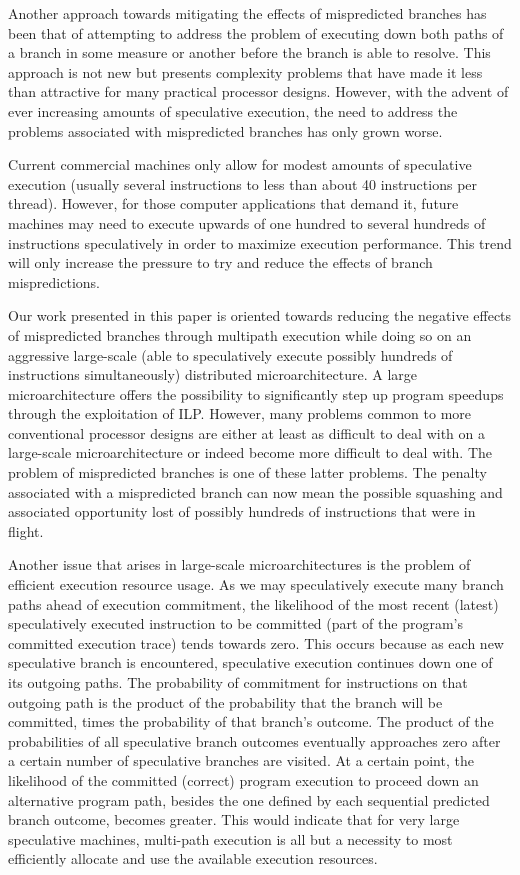 \documentclass[10pt,dvips]{article}
\begin{document}
Another approach towards mitigating the effects of mispredicted branches
has been that of attempting to address the problem of executing
down both paths of a branch in some measure or another before the
branch is able to resolve.  This approach is not new but presents
complexity problems that have made it less than attractive for
many practical processor designs.  However, with the advent of ever
increasing amounts of speculative execution, the need to address
the problems associated with mispredicted branches has only grown worse.

Current commercial machines only allow for modest
amounts of speculative execution (usually several instructions to 
less than about 40 instructions per thread).
However, for those computer applications that demand it,
future machines may need to execute upwards of one hundred to
several hundreds of instructions speculatively in order to maximize
execution performance.  This trend will only increase the pressure to try
and reduce the effects of branch mispredictions.

Our work presented in this paper is oriented towards reducing the
negative effects of mispredicted branches through multipath execution
while doing so on an aggressive large-scale (able to speculatively execute
possibly hundreds of instructions simultaneously)
distributed
microarchitecture.  
A large microarchitecture offers the
possibility to significantly step up program speedups through 
the exploitation of ILP.
However, many problems common to more conventional processor designs
are either at least as difficult to deal with on a large-scale
microarchitecture or indeed become more difficult to deal with.
The problem of mispredicted branches is one of these latter problems.
The penalty associated with a mispredicted branch can now mean
the possible squashing and associated opportunity lost of possibly
hundreds of instructions that were in flight.  

Another issue that arises in large-scale microarchitectures is the
problem of efficient execution resource usage.
As we may speculatively execute many branch paths ahead of execution
commitment, the likelihood
of the most recent (latest) speculatively executed instruction to
be committed (part of the program's committed execution trace) tends
towards zero.  This occurs because as each new speculative branch is
encountered, speculative execution continues down one of its
outgoing paths.  The probability of commitment for instructions on 
that outgoing
path is the product of the probability that
the branch will be committed, times the probability of that branch's outcome.
The product of the probabilities of all speculative branch outcomes
eventually approaches zero after a certain
number of speculative branches are visited. 
At a certain point, the likelihood of the committed (correct)
program execution to proceed down an alternative program path,
besides the one defined by each sequential predicted branch outcome,
becomes greater.  This would indicate that for very large speculative
machines, multi-path execution is all but a necessity to most
efficiently allocate and use the available execution resources.
\end{document}

